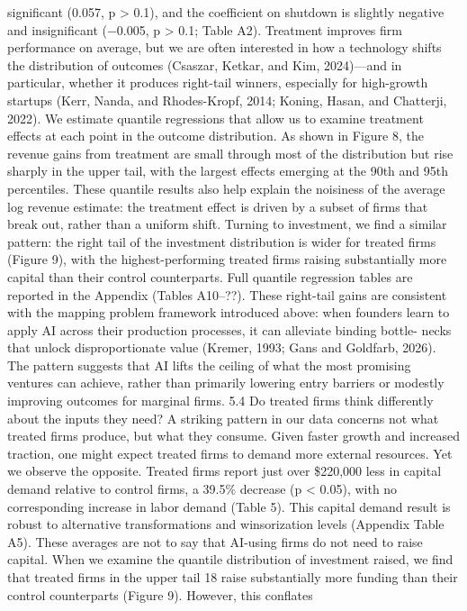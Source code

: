 significant (0.057, p > 0.1), and the coefficient on shutdown is slightly negative and insignificant
(−0.005, p > 0.1; Table A2).
Treatment improves firm performance on average, but we are often interested in how a technology
shifts the distribution of outcomes (Csaszar, Ketkar, and Kim, 2024)—and in particular, whether it
produces right-tail winners, especially for high-growth startups (Kerr, Nanda, and Rhodes-Kropf,
2014; Koning, Hasan, and Chatterji, 2022).
We estimate quantile regressions that allow us to
examine treatment effects at each point in the outcome distribution. As shown in Figure 8, the
revenue gains from treatment are small through most of the distribution but rise sharply in the
upper tail, with the largest effects emerging at the 90th and 95th percentiles. These quantile results
also help explain the noisiness of the average log revenue estimate: the treatment effect is driven by a
subset of firms that break out, rather than a uniform shift. Turning to investment, we find a similar
pattern: the right tail of the investment distribution is wider for treated firms (Figure 9), with the
highest-performing treated firms raising substantially more capital than their control counterparts.
Full quantile regression tables are reported in the Appendix (Tables A10–??).
These right-tail gains are consistent with the mapping problem framework introduced above:
when founders learn to apply AI across their production processes, it can alleviate binding bottle-
necks that unlock disproportionate value (Kremer, 1993; Gans and Goldfarb, 2026). The pattern
suggests that AI lifts the ceiling of what the most promising ventures can achieve, rather than
primarily lowering entry barriers or modestly improving outcomes for marginal firms.
5.4
Do treated firms think differently about the inputs they need?
A striking pattern in our data concerns not what treated firms produce, but what they consume.
Given faster growth and increased traction, one might expect treated firms to demand more external
resources. Yet we observe the opposite. Treated firms report just over \$220,000 less in capital
demand relative to control firms, a 39.5\% decrease (p < 0.05), with no corresponding increase in
labor demand (Table 5). This capital demand result is robust to alternative transformations and
winsorization levels (Appendix Table A5).
These averages are not to say that AI-using firms do not need to raise capital.
When we
examine the quantile distribution of investment raised, we find that treated firms in the upper tail
18
raise substantially more funding than their control counterparts (Figure 9). However, this conflates
